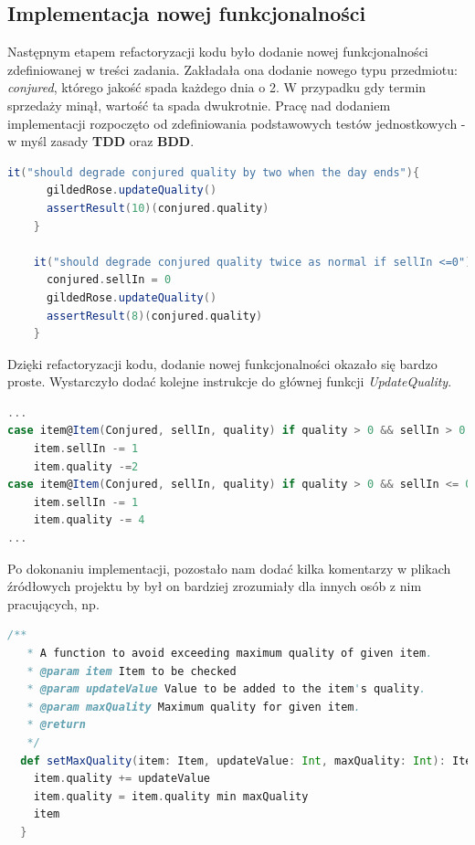 \documentclass[a4paper, 11pt]{article}
\begin{document}
\subsection{Implementacja nowej funkcjonalności}
Następnym etapem refactoryzacji kodu było dodanie nowej funkcjonalności zdefiniowanej w treści zadania. Zakładała ona dodanie nowego typu przedmiotu: \textit{conjured}, którego jakość spada każdego dnia o 2. W przypadku gdy termin sprzedaży minął, wartość ta spada dwukrotnie.
Pracę nad dodaniem implementacji rozpoczęto od zdefiniowania podstawowych testów jednostkowych - w myśl zasady \textbf{TDD} oraz \textbf{BDD}. 
\begin{lstlisting}[language=scala]
    it("should degrade conjured quality by two when the day ends"){
      gildedRose.updateQuality()
      assertResult(10)(conjured.quality)
    }

    it("should degrade conjured quality twice as normal if sellIn <=0"){
      conjured.sellIn = 0
      gildedRose.updateQuality()
      assertResult(8)(conjured.quality)
    } 
\end{lstlisting}
Dzięki refactoryzacji kodu, dodanie nowej funkcjonalności okazało się bardzo proste. Wystarczyło dodać kolejne instrukcje do głównej funkcji \textit{UpdateQuality}.
\begin{lstlisting}[language=scala]
...
case item@Item(Conjured, sellIn, quality) if quality > 0 && sellIn > 0 =>
    item.sellIn -= 1
    item.quality -=2
case item@Item(Conjured, sellIn, quality) if quality > 0 && sellIn <= 0 =>
    item.sellIn -= 1
    item.quality -= 4
...
\end{lstlisting}
Po dokonaniu implementacji, pozostało nam dodać kilka komentarzy w plikach źródłowych projektu by był on bardziej zrozumiały dla innych osób z nim pracujących, np.
\begin{lstlisting}[language=scala]
   /**
   * A function to avoid exceeding maximum quality of given item.
   * @param item Item to be checked
   * @param updateValue Value to be added to the item's quality.
   * @param maxQuality Maximum quality for given item.
   * @return
   */
  def setMaxQuality(item: Item, updateValue: Int, maxQuality: Int): Item = {
    item.quality += updateValue
    item.quality = item.quality min maxQuality
    item
  }

\end{lstlisting}
\end{document}
